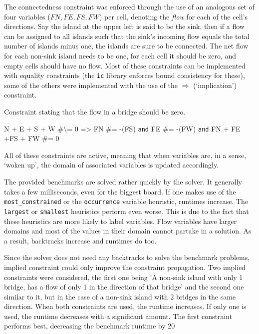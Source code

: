 The connectedness constraint was enforced through the use of an analogous set of four variables ($FN,FE,FS,FW$) per cell, denoting the \textit{flow} for each of the cell's directions. Say the island at the upper left is said to be the sink, then if a flow can be assigned to all islands such that the sink's incoming flow equals the total number of islands minus one, the islands are sure to be connected. The net flow for each non-sink island needs to be one, for each cell it should be zero, and empty cells should have no flow. Most of these constraints can be implemented with equality constraints (the \texttt{ic} library enforces bound consistency for these), some of the others were implemented with the use of the \href{http://eclipseclp.org/doc/bips/lib/ic/EG-2.html}{$\Rightarrow$} (`implication') constraint.\\\par

\begin{snippet}[H]
\caption{Constraint stating that the flow in a bridge should be zero.}\label{hashi}
\small
N + E + S + W \#\textbackslash= 0 => FN \#= -(FS) \texttt{and} FE \#= -(FW) \texttt{and} FN + FE +FS + FW \#= 0
\end{snippet}

All of these constraints are active, meaning that when variables are, in a sense, `woken up', the domain of associated variables is updated accordingly.\\\par

The provided benchmarks are solved rather quickly by the solver. It generally takes a few milliseconds, even for the biggest board. If one makes use of the \texttt{most\_constrained} or the \texttt{occurrence} variable heuristic, runtimes increase. The \texttt{largest} or \texttt{smallest} heuristics perform even worse. This is due to the fact that these heuristics are more likely to label variables. Flow variables have larger domains and most of the values in their domain cannot partake in a solution. As a result, backtracks increase and runtimes do too.\\\par

Since the solver does not need any backtracks to solve the benchmark problems, implied constraint could only improve the constraint propagation. Two implied constraints were considered, the first one being 'A non-sink island with only 1 bridge, has a flow of only 1 in the direction of that bridge' and the second one similar to it, but in the case of a non-sink island with 2 bridges in the same direction. When both constraints are used, the runtime increases. If only one is used, the runtime decreases with a significant amount. The first constraint performs best, decreasing the benchmark runtime by 20%

